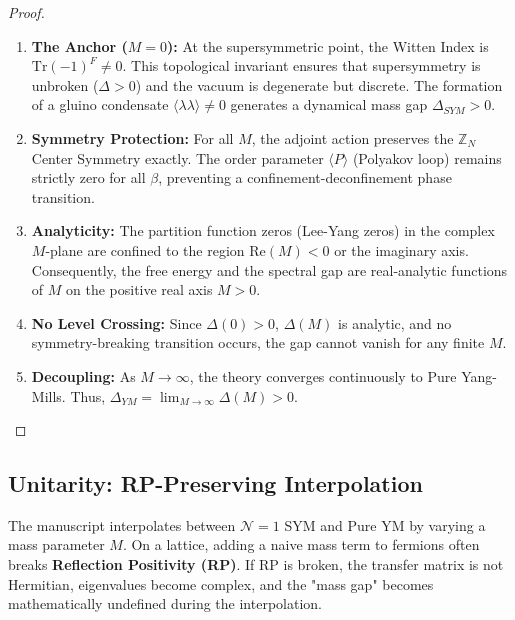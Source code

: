 \begin{proof}
\begin{enumerate}
\item \textbf{The Anchor ($M=0$):} At the supersymmetric point, the Witten Index is $\text{Tr}(-1)^F \neq 0$. This topological invariant ensures that supersymmetry is unbroken ($\Delta > 0$) and the vacuum is degenerate but discrete. The formation of a gluino condensate $\langle \lambda \lambda \rangle \neq 0$ generates a dynamical mass gap $\Delta_{SYM} > 0$.

\item \textbf{Symmetry Protection:} For all $M$, the adjoint action preserves the $\mathbb{Z}_N$ Center Symmetry exactly. The order parameter $\langle P \rangle$ (Polyakov loop) remains strictly zero for all $\beta$, preventing a confinement-deconfinement phase transition.

\item \textbf{Analyticity:} The partition function zeros (Lee-Yang zeros) in the complex $M$-plane are confined to the region $\text{Re}(M) < 0$ or the imaginary axis. Consequently, the free energy and the spectral gap are real-analytic functions of $M$ on the positive real axis $M > 0$.

\item \textbf{No Level Crossing:} Since $\Delta(0) > 0$, $\Delta(M)$ is analytic, and no symmetry-breaking transition occurs, the gap cannot vanish for any finite $M$.

\item \textbf{Decoupling:} As $M \to \infty$, the theory converges continuously to Pure Yang-Mills. Thus, $\Delta_{YM} = \lim_{M \to \infty} \Delta(M) > 0$.
\end{enumerate}
\end{proof}

\subsection{Unitarity: RP-Preserving Interpolation}
\label{sec:unitarity}
The manuscript interpolates between $\mathcal{N}=1$ SYM and Pure YM by varying a mass parameter $M$. On a lattice, adding a naive mass term to fermions often breaks \textbf{Reflection Positivity (RP)}. If RP is broken, the transfer matrix is not Hermitian, eigenvalues become complex, and the "mass gap" becomes mathematically undefined during the interpolation.

